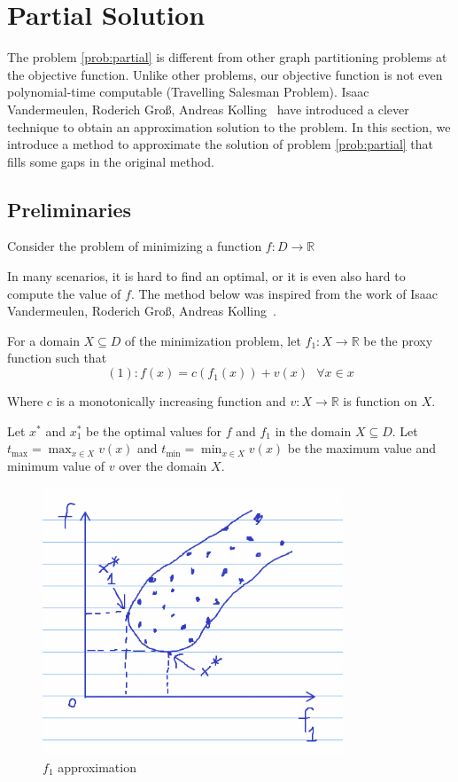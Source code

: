 \section{Partial Solution}

The problem \ref{prob:partial} is different from other graph partitioning problems at the objective function. Unlike other problems, our objective function is not even polynomial-time computable (Travelling Salesman Problem). Isaac Vandermeulen, Roderich Groß, Andreas Kolling~\cite{vandermeulen2019balanced} have introduced a clever technique to obtain an approximation solution to the problem. In this section, we introduce a method to approximate the solution of problem \ref{prob:partial} that fills some gaps in the original method.

\subsection{Preliminaries}

Consider the problem of minimizing a function $f: D \to \mathbb{R}$

In many scenarios, it is hard to find an optimal, or it is even also hard to compute the value of $f$.
The method below was inspired from the work of Isaac Vandermeulen, Roderich Groß, Andreas Kolling~\cite{vandermeulen2019balanced}.

For a domain $X \subseteq D$ of the minimization problem,  let $f_1: X \to \mathbb{R}$ be the proxy function such that
\[
    (1): f(x) = c(f_1(x)) + v(x) \text{ } \forall x \in x
\]


Where $c$ is a monotonically increasing function and $v: X \to \mathbb{R}$ is function on $X$.

Let $x^*$ and $x^*_1$ be the optimal values for $f$ and $f_1$ in the domain $X \subseteq D$.
Let $t_{\max} = \max_{x \in X} v(x)$ and $t_{\min} = \min_{x \in X} v(x)$ be the maximum value and minimum value of $v$ over the domain $X$. 

\begin{figure}[h!]
\centering
\includegraphics[width=0.8\textwidth]{assets/f1_approximation.png}
\caption{$f_1$ approximation}
\label{fig:f1_approximation}
\end{figure}

